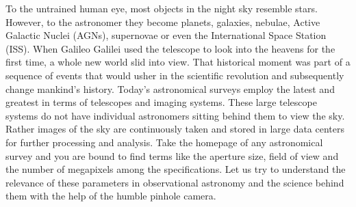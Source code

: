 \documentclass{../template/texnote}
\title{\textbf{\capitalisewords{A sneak peak into the science behind telescopes}}}
\begin{document}
    \maketitle {}

To the untrained human eye, most objects in the night sky resemble stars. However, to the astronomer they become planets, galaxies, nebulae, Active Galactic Nuclei (AGNs), supernovae or even the International Space Station (ISS).
When Galileo Galilei used the telescope to look into the heavens for the first time, a whole new world slid into view. That historical moment was part of a sequence of events that would usher in the scientific revolution and subsequently change mankind's history.
Today's astronomical surveys employ the latest and greatest in terms of telescopes and imaging systems. These large telescope systems do not have individual astronomers sitting behind them to view the sky. Rather images of the sky are continuously taken and stored in large data centers for further processing and analysis.
Take the homepage of any astronomical survey and you are bound to find terms like the aperture size, field of view and the number of megapixels among the specifications. Let us try to understand the  relevance of these parameters in observational astronomy and the science behind them with the help of the humble pinhole camera.
\end{document}
